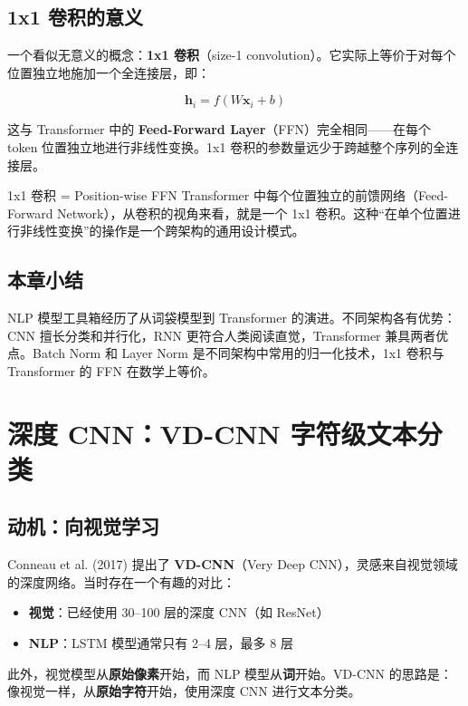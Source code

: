\documentclass[a4paper]{article}
\begin{document}
\subsection{1x1 卷积的意义}

一个看似无意义的概念：\textbf{1x1 卷积}（size-1 convolution）。它实际上等价于对每个位置独立地施加一个全连接层，即：

$$\mathbf{h}_i = f(W\mathbf{x}_i + b)$$

这与 Transformer 中的 \textbf{Feed-Forward Layer}（FFN）完全相同——在每个 token 位置独立地进行非线性变换。1x1 卷积的参数量远少于跨越整个序列的全连接层。

\begin{importantbox}{1x1 卷积 = Position-wise FFN}
Transformer 中每个位置独立的前馈网络（Feed-Forward Network），从卷积的视角来看，就是一个 1x1 卷积。这种``在单个位置进行非线性变换''的操作是一个跨架构的通用设计模式。
\end{importantbox}

\subsection{本章小结}

NLP 模型工具箱经历了从词袋模型到 Transformer 的演进。不同架构各有优势：CNN 擅长分类和并行化，RNN 更符合人类阅读直觉，Transformer 兼具两者优点。Batch Norm 和 Layer Norm 是不同架构中常用的归一化技术，1x1 卷积与 Transformer 的 FFN 在数学上等价。


\section{深度 CNN：VD-CNN 字符级文本分类}

\subsection{动机：向视觉学习}

Conneau et al. (2017) 提出了 \textbf{VD-CNN}（Very Deep CNN），灵感来自视觉领域的深度网络。当时存在一个有趣的对比：

\begin{itemize}
    \item \textbf{视觉}：已经使用 30--100 层的深度 CNN（如 ResNet）
    \item \textbf{NLP}：LSTM 模型通常只有 2--4 层，最多 8 层
\end{itemize}

此外，视觉模型从\textbf{原始像素}开始，而 NLP 模型从\textbf{词}开始。VD-CNN 的思路是：像视觉一样，从\textbf{原始字符}开始，使用深度 CNN 进行文本分类。
\end{document}
